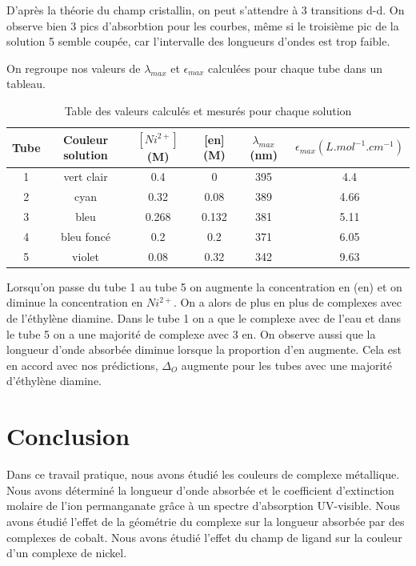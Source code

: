 \documentclass[12pt]{article}
\begin{document}
D'après la théorie du champ cristallin, on peut s'attendre à 3 transitions d-d. 
On observe bien 3 pics d'absorbtion pour les courbes, même si le troisième pic de la solution 5 semble coupée, car l'intervalle des longueurs d'ondes est trop faible.

On regroupe nos valeurs de $\lambda_{max}$ et $\epsilon_{max}$ calculées pour chaque tube dans un tableau.

\begin{table}[h!]
    \begin{center}
        \begin{tabular}[pos]{|c|c|c|c|c|c|}
            \hline
            Tube & Couleur solution & $[Ni^{2+}]$ (M) & [en] (M) & $\lambda_{max}$ (nm) & $\epsilon_{max} (L.mol^{-1}.cm^{-1})$ \\
            \hline
            1 &  vert clair & 0.4 & 0 & 395 & 4.4\\
            2 & cyan & 0.32 & 0.08 & 389 & 4.66\\
            3 & bleu & 0.268 & 0.132 & 381 & 5.11\\
            4 & bleu foncé & 0.2 & 0.2 & 371 & 6.05\\
            5 & violet & 0.08 & 0.32 & 342 & 9.63\\
            \hline  
        \end{tabular}
        \caption{Table des valeurs calculés et mesurés pour chaque solution}
        \label{table2:donne3partie}
    \end{center}
\end{table}

Lorsqu'on passe du tube 1 au tube 5 on augmente la concentration en (en) et on diminue la concentration en $Ni^{2+}$. 
On a alors de plus en plus de complexes avec de l'éthylène diamine.
Dans le tube 1 on a que le complexe avec de l'eau et dans le tube 5 on a une majorité de complexe avec 3 en. 
On observe aussi que la longueur d'onde absorbée diminue lorsque la proportion d'en augmente.
Cela est en accord avec nos prédictions, $\Delta_O$ augmente pour les tubes avec une majorité d'éthylène diamine.

\section*{Conclusion}
Dans ce travail pratique, nous avons étudié les couleurs de complexe métallique. Nous
avons déterminé la longueur d'onde absorbée et le coefficient d'extinction molaire de
l'ion permanganate grâce à un spectre d'absorption UV-visible. Nous avons étudié l'effet
de la géométrie du complexe sur la longueur absorbée par des complexes de cobalt. Nous
avons étudié l'effet du champ de ligand sur la couleur d'un complexe de nickel.
\end{document}
